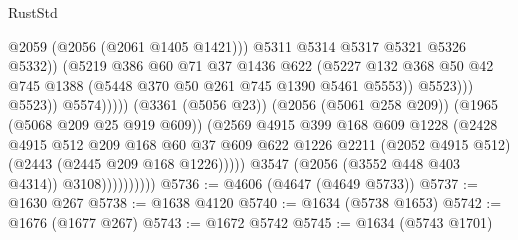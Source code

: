\begin{lexlean}{RustStd}
\begin{coremodule}
                                                  @2059
                                                  (@2056 (@2061 @1405 @1421)))
                                                @5311
                                                @5314
                                                @5317
                                                @5321
                                                @5326
                                                @5332))
                                            (@5219
                                              @386
                                              @60
                                              @71
                                              @37
                                              @1436
                                              @622
                                              (@5227
                                                @132
                                                @368
                                                @50
                                                @42
                                                @745
                                                @1388
                                                (@5448 @370 @50 @261 @745 @1390 @5461 @5553))
                                              @5523)))
                                        @5523))
                                    @5574)))))
                          (@3361 (@5056 @23))
                          (@2056 (@5061 @258 @209))
                          (@1965 (@5068 @209 @25 @919 @609))
                          (@2569
                            @4915
                            @399
                            @168
                            @609
                            @1228
                            (@2428
                              @4915
                              @512
                              @209
                              @168
                              @60
                              @37
                              @609
                              @622
                              @1226
                              @2211
                              (@2052 @4915 @512)
                              (@2443 (@2445 @209 @168 @1226)))))
                        @3547
                        (@2056 (@3552 @448 @403 @4314))
                        @3108))))))))))
@5736 := @4606 (@4647 (@4649 @5733))
@5737 := @1630 @267
@5738 := @1638 @4120
@5740 := @1634 (@5738 @1653)
@5742 := @1676 (@1677 @267)
@5743 := @1672 @5742
@5745 := @1634 (@5743 @1701)

\end{coremodule}
\end{lexlean}
